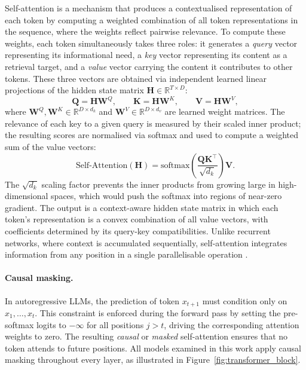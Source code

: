 Self-attention is a mechanism that produces a contextualised representation of each
token by computing a weighted combination of all token representations in the
sequence, where the weights reflect pairwise relevance. To compute these weights,
each token simultaneously takes three roles: it generates a \emph{query} vector
representing its informational need, a \emph{key} vector representing its content as
a retrieval target, and a \emph{value} vector carrying the content it contributes to
other tokens. These three vectors are obtained via independent learned linear
projections of the hidden state matrix $\mathbf{H} \in \mathbb{R}^{T \times D}$:
\begin{equation}
    \mathbf{Q} = \mathbf{H}\mathbf{W}^Q, \qquad
    \mathbf{K} = \mathbf{H}\mathbf{W}^K, \qquad
    \mathbf{V} = \mathbf{H}\mathbf{W}^V,
    \label{eq:qkv_projections}
\end{equation}
where $\mathbf{W}^Q, \mathbf{W}^K \in \mathbb{R}^{D \times d_k}$ and
$\mathbf{W}^V \in \mathbb{R}^{D \times d_v}$ are learned weight matrices. The
relevance of each key to a given query is measured by their scaled inner product;
the resulting scores are normalised via softmax and used to compute a weighted sum
of the value vectors:
\begin{equation}
    \text{Self-Attention}(\mathbf{H}) =
    \text{softmax}\!\left(\frac{\mathbf{Q}\mathbf{K}^\top}{\sqrt{d_k}}\right)\mathbf{V}.
    \label{eq:self_attention}
\end{equation}
The $\sqrt{d_k}$ scaling factor prevents the inner products from growing large in
high-dimensional spaces, which would push the softmax into regions of near-zero
gradient. The output is a context-aware hidden state matrix in which each token's
representation is a convex combination of all value vectors, with coefficients
determined by its query-key compatibilities. Unlike recurrent networks, where context
is accumulated sequentially, self-attention integrates information from any position
in a single parallelisable operation \citep{vaswani2017attention}.

\paragraph{Causal masking.}
In autoregressive LLMs, the prediction of token $x_{t+1}$ must condition only on
$x_1, \ldots, x_t$. This constraint is enforced during the forward pass by setting
the pre-softmax logits to $-\infty$ for all positions $j > t$, driving the
corresponding attention weights to zero. The resulting \emph{causal} or
\emph{masked} self-attention ensures that no token attends to future positions. All
models examined in this work apply causal masking throughout every layer, as
illustrated in Figure~\ref{fig:transformer_block}.

